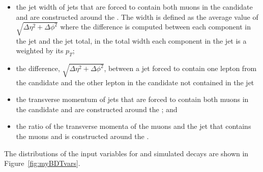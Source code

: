 \begin{itemize}
\item  the jet width of jets that are forced to contain both muons in the \bsmumu candidate and are constructed around the \bs. The width is defined as the average value of $\sqrt{\Delta \eta^2 + \Delta \phi^2}$ where the difference is computed between each component in the jet and the jet total, in the total width each component in the jet is a weighted by its $p_{T}$;
\item the difference, $\sqrt{\Delta \eta^2 + \Delta \phi^2}$, between a jet forced to contain one lepton from the \bsmumu candidate and the other lepton in the \bsmumu candidate not contained in the jet
\item the transverse momentum of jets that are forced to contain both muons in the \bsmumu candidate and are constructed around the \bs; and 
\item the ratio of the transverse momenta of the muons and the jet that contains the muons and is constructed around the \bs.
\end{itemize}

The distributions of the input variables for \bsmumu and  simulated decays are shown in Figure~\ref{fig:myBDTvars}.

